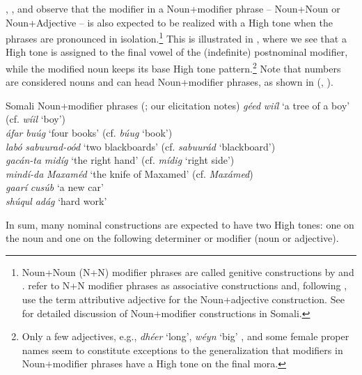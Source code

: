\documentclass[output=paper]{langscibook}
\begin{document}
\citet{Green2016}, \citet{Hyman1981}, and \citet{Saeed1993} observe that the modifier in a Noun+modifier phrase – Noun+Noun or Noun+Adjective – is also expected to be realized with a High tone when the phrases are pronounced in isolation.\footnote{Noun+Noun (N+N) modifier phrases are called genitive constructions by \citet{Hyman1981} and \citet{Saeed1993}. \citet{Green2016} refer to N+N modifier phrases as associative constructions and, following \citet{Saeed1993}, use the term attributive adjective for the Noun+adjective construction. See \citet{Saeed1993} for detailed discussion of Noun+modifier constructions in Somali.} This is illustrated in , where we see that a High tone is assigned to the final vowel of the (indefinite) postnominal modifier, while the modified noun keeps its base High tone pattern.\footnote{Only a few adjectives, e.g., \textit{dhéer} ‘long’, \textit{wéyn} ‘big’ \citep[105--106]{Saeed1999}, and some female proper names seem to constitute exceptions to the generalization that modifiers in Noun+modifier phrases have a High tone on the final mora.} Note that numbers are considered nouns \citep[123]{Saeed1993} and can head Noun+modifier phrases, as shown in (, ).


\ea  Somali Noun+modifier phrases (\citealt{Hyman1981,Green2016}; our elicitation notes)  \label{ex:downing:4}
  \ea \textit{géed} \textit{wiíl}  ‘a tree of a boy’  (cf. \textit{wíil} ‘boy’) \label{ex:downing:4a}\\
  \ex \textit{áfar} \textit{buúg}  ‘four books’  (cf. \textit{búug} ‘book’)\label{ex:downing:4b}\\
  \ex \textit{labó} \textit{sabuurad-oód}  ‘two blackboards’  (cf. \textit{sabuurád} ‘blackboard’)\label{ex:downing:4c}\\
  \ex \textit{gacán-ta} \textit{midíg}  ‘the right hand’  (cf. \textit{mídig} ‘right side’)\label{ex:downing:4d}\\
  \ex \textit{mindí-da} \textit{Maxaméd}  ‘the knife of Maxamed’  (cf. \textit{Maxámed})\label{ex:downing:4e}\\
  \ex \textit{gaarí} \textit{cusúb}  ‘a new car’\label{ex:downing:4f}\\
  \ex \textit{shúqul} \textit{adág}  ‘hard work’\label{ex:downing:4g}\\
  \z
\z
 
In sum, many nominal constructions are expected to have two High tones: one on the noun and one on the following determiner or modifier (noun or adjective).
\end{document}

